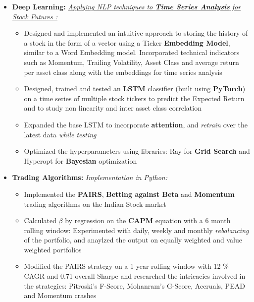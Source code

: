 \documentclass{article}
\begin{document}
\begin{itemize}[itemsep = -1 mm, leftmargin=*]
    \item \textbf{Deep Learning: }\underline{\it Applying NLP techniques to \textbf{Time Series Analysis} for Stock Futures :}
    \vspace{-7pt}
    \begin{itemize}[itemsep = -0.75 mm, leftmargin=*]
      \item Designed and implemented an intuitive approach to storing the history of a stock in the form of a vector using a Ticker \textbf{Embedding Model}, similar to a Word Embedding model. Incorporated technical indicators such as Momentum, Trailing Volatility, Asset Class and average return per asset class along with the embeddings for time series analysis
     \item Designed, trained and tested an \textbf{LSTM} classifier (built using \textbf{PyTorch}) on a time series of multiple stock tickers to predict the Expected Return and to study non linearity and inter asset class correlation
     \item Expanded the base LSTM to incorporate \textbf{attention}, and \textit{retrain} over the latest data \textit{while testing}
     \item Optimized the hyperparameters using libraries: Ray for \textbf{Grid Search} and Hyperopt for \textbf{Bayesian} optimization
    \end{itemize}
    \vspace{-4pt}
    \item \textbf{Trading Algorithms: }{\it Implementation in Python:}
    \vspace{-7pt}
    \begin{itemize}[itemsep = -0.75 mm, leftmargin=*]
      \item Implemented the \textbf{PAIRS}, \textbf{Betting against Beta} and \textbf{Momentum} trading algorithms on the Indian Stock market
      \item Calculated $\beta$ by regression on the \textbf{CAPM} equation with a 6 month rolling window: Experimented with daily, weekly and monthly \textit{rebalancing} of the portfolio, and anaylzed the output on equally weighted and value weighted portfolios
     \item Modified the PAIRS strategy on a 1 year rolling window with 12 \% CAGR and 0.71 overall Sharpe and researched the intricacies involved in the strategies:  Pitroski's F-Score, Mohanram's G-Score, Accruals, PEAD and Momentum crashes
    \end{itemize}
\end{itemize}
\end{document}
